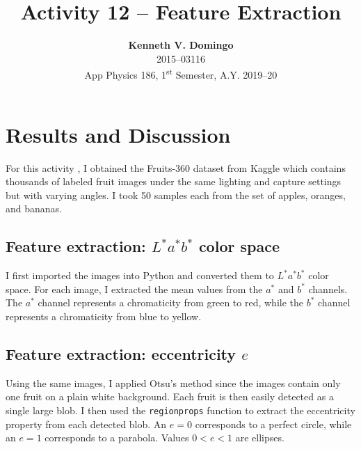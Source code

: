 \documentclass[12pt,a4paper]{article}
\newcommand{\activity}{Activity 12 -- Feature Extraction}
\begin{document}
\title{\TitleFont \activity}
\author[ ]{\textbf{Kenneth V. Domingo} \\
2015--03116 \\
App Physics 186, 1\textsuperscript{st} Semester, A.Y. 2019--20}

\maketitle
\thispagestyle{titlestyle}

\section*{Results and Discussion}
\setcounter{section}{1}

For this activity \cite{soriano}, I obtained the Fruits-360 dataset from Kaggle \cite{kaggle} which contains thousands of labeled fruit images under the same lighting and capture settings but with varying angles. I took 50 samples each from the set of apples, oranges, and bananas.

\subsection{Feature extraction: $L^*a^*b^*$ color space}
I first imported the images into Python and converted them to $L^*a^*b^*$ color space. For each image, I extracted the mean values from the $a^*$ and $b^*$ channels. The $a^*$ channel represents a chromaticity from green to red, while the $b^*$ channel represents a chromaticity from blue to yellow.

\subsection{Feature extraction: eccentricity $e$}
Using the same images, I applied Otsu's method since the images contain only one fruit on a plain white background. Each fruit is then easily detected as a single large blob. I then used the \texttt{regionprops} function to extract the eccentricity property from each detected blob. An $e = 0$ corresponds to a perfect circle, while an $e = 1$ corresponds to a parabola. Values $0 < e < 1$ are ellipses.
\end{document}

